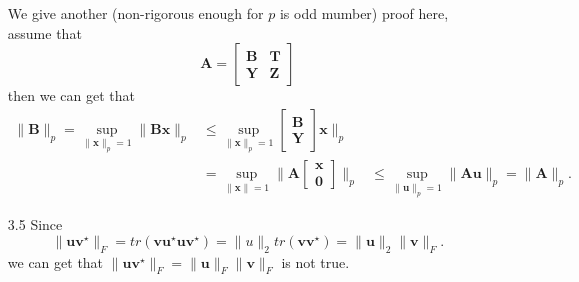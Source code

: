 \begin{enumerate}
{        \begin{remark}
            We give another (non-rigorous enough for $p$ is odd mumber) proof here, assume that 
            $$
            \bm{A} = \begin{bmatrix}
                \bm{B} & \bm{T} \\
                \bm{Y} & \bm{Z}
            \end{bmatrix}
            $$
            then we can get that 
            $$
            \begin{aligned}
           \| \bm{B} \|_p = \sup_{\| \bm{x} \|_p = 1} \| \bm{Bx} \|_p & \leq \sup_{\| \bm{x} \|_p = 1} \begin{bmatrix}
            \bm{B} \\ \bm{Y}
           \end{bmatrix} \bm{x} \|_p \\ 
           & = \sup_{\| \bm{x} \| = 1} \| \bm{A} \begin{bmatrix}
            \bm{x} \\ \bm{0}
           \end{bmatrix}\|_p & \leq \sup_{\| \bm{u}\|_p = 1} \| \bm{Au}\|_{p} = \| \bm{A} \|_p.
            \end{aligned}
            $$
        \end{remark}
    }   
    \item[3.5] {
        Since
        $$
       \| \bm{u} \bm{v}^{\star}\|_F = tr (\bm{v} \bm{u}^{\star} \bm{u} \bm{v}^{\star}) = \| u\|_2 tr(\bm{v} \bm{v}^{\star}) = \| \bm{u}\|_2 \| \bm{v} \|_F.
        $$
        we can get that $\| \bm{u} \bm{v}^{\star}\|_F = \| \bm{u}\|_F \| \bm{v} \|_F$ is not true.
    }


\end{enumerate}
